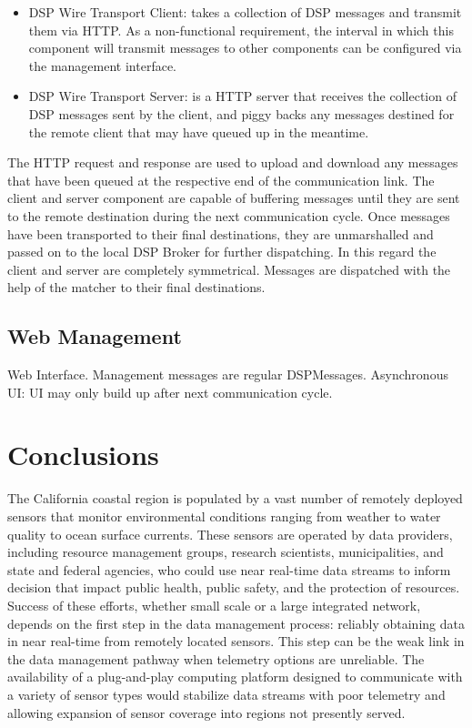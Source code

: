 \documentclass[conference]{IEEEtran}
\begin{document}
\begin{itemize}
\item DSP Wire Transport Client: takes a collection of DSP messages
  and transmit them via HTTP. As a non-functional requirement, the
  interval in which this component will transmit messages to other
  components can be configured via the management interface.
\item DSP Wire Transport Server: is a HTTP server that receives the
  collection of DSP messages sent by the client, and piggy backs any
  messages destined for the remote client that may have queued up in
  the meantime.
\end{itemize}

The HTTP request and response are used to upload and download any
messages that have been queued at the respective end of the
communication link. The client and server component are capable of
buffering messages until they are sent to the remote destination
during the next communication cycle. Once messages have been
transported to their final destinations, they are unmarshalled and
passed on to the local DSP Broker for further dispatching. In this
regard the client and server are completely symmetrical. Messages are
dispatched with the help of the matcher to their final destinations.


\subsection{Web Management}

Web Interface. Management messages are regular
DSPMessages. Asynchronous UI: UI may only build up after next
communication cycle.

\section{Conclusions}
\label{SEC_CONCLUSION}

The California coastal region is populated by a vast number of
remotely deployed sensors that monitor environmental conditions
ranging from weather to water quality to ocean surface currents.
These sensors are operated by data providers, including resource
management groups, research scientists, municipalities, and state and
federal agencies, who could use near real-time data streams to inform
decision that impact public health, public safety, and the protection
of resources. Success of these efforts, whether small scale or a large
integrated network, depends on the first step in the data management
process: reliably obtaining data in near real-time from remotely
located sensors.  This step can be the weak link in the data
management pathway when telemetry options are unreliable.  The
availability of a plug-and-play computing platform designed to
communicate with a variety of sensor types would stabilize data
streams with poor telemetry and allowing expansion of sensor coverage
into regions not presently served.
\end{document}
